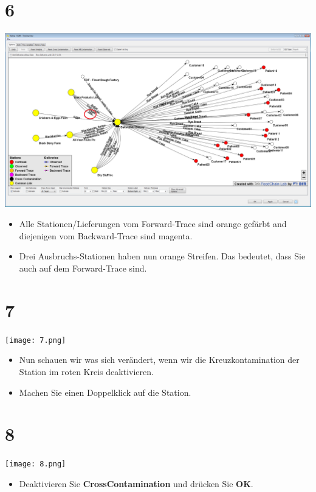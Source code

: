 \documentclass{beamer}
\begin{document}
\section{6}
\begin{frame}
	\begin{center}
  		\includegraphics[height=0.6\textheight]{6.png}
	\end{center}
	\begin{itemize}
		\item Alle Stationen/Lieferungen vom Forward-Trace sind orange gefärbt and diejenigen vom Backward-Trace sind magenta.
		\item Drei Ausbruchs-Stationen haben nun orange Streifen. Das bedeutet, dass Sie auch auf dem Forward-Trace sind.
	\end{itemize}
\end{frame}

\section{7}
\begin{frame}
	\begin{center}
  		\texttt{[image: 7.png]}
	\end{center}
	\begin{itemize}
		\item Nun schauen wir was sich verändert, wenn wir die Kreuzkontamination der Station im roten Kreis deaktivieren.
		\item Machen Sie einen Doppelklick auf die Station.
	\end{itemize}
\end{frame}

\section{8}
\begin{frame}
	\begin{center}
  		\texttt{[image: 8.png]}
	\end{center}
	\begin{itemize}
		\item Deaktivieren Sie \textbf{CrossContamination} und drücken Sie \textbf{OK}.
	\end{itemize}
\end{frame}
\end{document}
